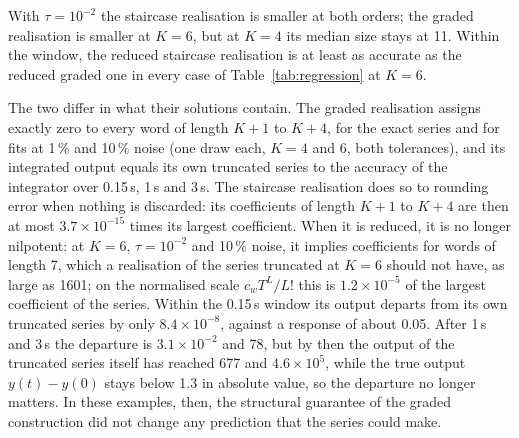\documentclass[11pt,a4paper]{article}
\theoremstyle{remark}
\begin{document}
With $\tau=10^{-2}$ the staircase realisation is smaller at both orders; the graded realisation is smaller at $K=6$, but at $K=4$ its median size stays at 11.
Within the window, the reduced staircase realisation is at least as accurate as the reduced graded one in every case of Table~\ref{tab:regression} at $K=6$.

The two differ in what their solutions contain.
The graded realisation assigns exactly zero to every word of length $K+1$ to $K+4$, for the exact series and for fits at 1\,\% and 10\,\% noise (one draw each, $K=4$ and 6, both tolerances), and its integrated output equals its own truncated series to the accuracy of the integrator over 0.15\,s, 1\,s and 3\,s.
The staircase realisation does so to rounding error when nothing is discarded: its coefficients of length $K+1$ to $K+4$ are then at most $3.7\times10^{-15}$ times its largest coefficient.
When it is reduced, it is no longer nilpotent: at $K=6$, $\tau=10^{-2}$ and 10\,\% noise, it implies coefficients for words of length 7, which a realisation of the series truncated at $K=6$ should not have, as large as 1601; on the normalised scale $c_wT^L/L!$ this is $1.2\times10^{-5}$ of the largest coefficient of the series.
Within the 0.15\,s window its output departs from its own truncated series by only $8.4\times10^{-8}$, against a response of about 0.05.
After 1\,s and 3\,s the departure is $3.1\times10^{-2}$ and 78, but by then the output of the truncated series itself has reached 677 and $4.6\times10^{5}$, while the true output $y(t)-y(0)$ stays below 1.3 in absolute value, so the departure no longer matters.
In these examples, then, the structural guarantee of the graded construction did not change any prediction that the series could make.
\end{document}
